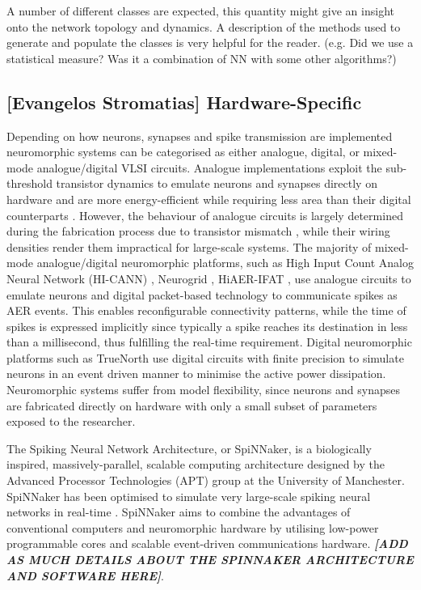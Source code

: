 A number of different classes are expected, this quantity might give an insight onto the network topology and dynamics. A description of the methods used to generate and populate the classes is very helpful for the reader. (e.g. Did we use a statistical measure? Was it a combination of NN with some other algorithms?)




\subsection{[Evangelos Stromatias] Hardware-Specific}


Depending on how neurons, synapses and spike transmission are implemented neuromorphic systems can be categorised as either analogue, digital, or mixed-mode analogue/digital VLSI circuits. Analogue implementations exploit the sub-threshold transistor dynamics to emulate neurons and synapses directly on hardware \citep{giacom} and are more energy-efficient while requiring less area than their digital counterparts \citep{temamanalogdigital}. However, the behaviour of analogue circuits is largely determined during the fabrication process due to transistor mismatch \citep{giacom,analoguemismatch,bernabeDACsynapses}, while their wiring densities render them impractical for large-scale systems. The majority of mixed-mode analogue/digital neuromorphic platforms, such as High Input Count Analog Neural Network (HI-CANN) \citep{Schemmel_etal10}, Neurogrid \citep{Benjamin_etal14}, HiAER-IFAT \citep{gert}, use analogue circuits to emulate neurons and digital packet-based technology to communicate spikes as AER events. This enables reconfigurable connectivity patterns, while the time of spikes is expressed implicitly since typically a spike reaches its destination in less than a millisecond, thus fulfilling the real-time requirement. Digital neuromorphic platforms such as TrueNorth \citep{Merolla08082014} use digital circuits with finite precision to simulate neurons in an event driven manner to minimise the active power dissipation. Neuromorphic systems suffer from model flexibility, since neurons and synapses are fabricated directly on hardware with only a small subset of parameters exposed to the researcher. 

The Spiking Neural Network Architecture, or SpiNNaker, is a biologically inspired, massively-parallel, scalable computing architecture designed by the Advanced Processor Technologies (APT) group at the University of Manchester. SpiNNaker has been optimised to simulate very large-scale spiking neural networks in real-time \citep{spiNNakerProject}. SpiNNaker aims to combine the advantages of conventional computers and neuromorphic hardware by utilising low-power programmable cores and scalable event-driven communications hardware. \textit{\textbf{[ADD AS MUCH DETAILS ABOUT THE SPINNAKER ARCHITECTURE AND SOFTWARE HERE]}}. 


